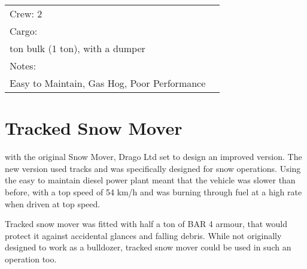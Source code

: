 \documentclass{tufte-book}
\begin{document}
\begin{minipage}{\textwidth}
\begin{center}
\begin{tabular}{llll}
\multicolumn{3}{l}{Crew: 2} \\
Cargo: & & \\
\multicolumn{3}{l}{\quad 1 ton bulk (1 ton), with a dumper} \\

Notes: & & \\
\multicolumn{3}{l}{\quad Easy to Maintain, Gas Hog, Poor Performance} \\
\bottomrule
\end{tabular}
\end{center}
\end{minipage}

\clearpage
\section{Tracked Snow Mover}
 with the original Snow Mover, Drago Ltd set to design an
improved version. The new version used tracks and was specifically
designed for snow operations. Using the easy to maintain diesel power
plant meant that the vehicle was slower than before, with a top speed
of 54 km/h and was burning through fuel at a high rate when driven at top
speed.

Tracked snow mover was fitted with half a ton of BAR 4 armour, that would
protect it against accidental glances and falling debris. While not
originally designed to work as a bulldozer, tracked snow mover could be used
in such an operation too.
\end{document}
